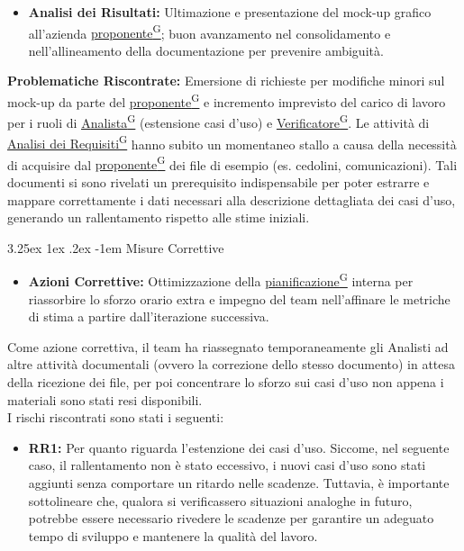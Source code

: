 \documentclass[a4paper,12pt]{article}
\makeatletter
\renewcommand\paragraph{\@startsection{paragraph}{5}{\z@}%
  {3.25ex \@plus1ex \@minus.2ex}%
  {-1em}%
  {\normalfont\normalsize\bfseries}}
\providecommand{\glslink}[2]{\href{https://alittlebyte-19.github.io/Documentazione/glossario.html\#gls-#1}{\underline{#2}\textsuperscript{\scriptsize G}}}
\makeatother
\begin{document}
\begin{itemize}
    \item \textbf{Analisi dei Risultati:} Ultimazione e presentazione del mock-up grafico all'azienda \glslink{committente-proponente}{proponente}; buon avanzamento nel consolidamento e nell'allineamento della documentazione per prevenire ambiguità.
\end{itemize}
\textbf{Problematiche Riscontrate:} Emersione di richieste per modifiche minori sul mock-up da parte del \glslink{committente-proponente}{proponente} e incremento imprevisto del carico di lavoro per i ruoli di \glslink{analista}{Analista} (estensione casi d'uso) e \glslink{verificatore}{Verificatore}. Le attività di \glslink{analisi-dei-requisiti-adr}{Analisi dei Requisiti} hanno subito un momentaneo stallo a causa della necessità di acquisire dal \glslink{committente-proponente}{proponente} dei file di esempio (es. cedolini, comunicazioni). Tali documenti si sono rivelati un prerequisito indispensabile per poter estrarre e mappare correttamente i dati necessari alla descrizione dettagliata dei casi d'uso, generando un rallentamento rispetto alle stime iniziali.


\paragraph{Misure Correttive}

\begin{itemize}
    \item \textbf{Azioni Correttive:} Ottimizzazione della \glslink{pianificazione}{pianificazione} interna per riassorbire lo sforzo orario extra e impegno del team nell'affinare le metriche di stima a partire dall'iterazione successiva.
\end{itemize}
Come azione correttiva, il team ha riassegnato temporaneamente gli Analisti ad altre attività documentali (ovvero la correzione dello stesso documento) in attesa della ricezione dei file, per poi concentrare lo sforzo sui casi d'uso non appena i materiali sono stati resi disponibili.\\
I rischi riscontrati sono stati i seguenti:
\begin{itemize}
    \item \textbf{RR1:} Per quanto riguarda l'estenzione dei casi d'uso. Siccome, nel seguente caso, il rallentamento non è stato eccessivo, i nuovi casi d'uso sono stati aggiunti senza comportare un ritardo nelle scadenze. Tuttavia, è importante sottolineare che, qualora si verificassero situazioni analoghe in futuro, potrebbe essere necessario rivedere le scadenze per garantire un adeguato tempo di sviluppo e mantenere la qualità del lavoro.
\end{itemize}
\end{document}
